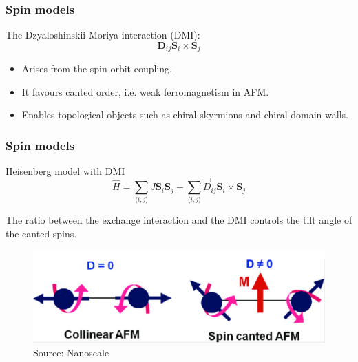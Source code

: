 \documentclass{beamer}
\newcommand{\bs}[1] {\boldsymbol{#1}}
\begin{document}
\begin{frame}
\frametitle{Spin models}
The Dzyaloshinskii-Moriya interaction (DMI):
\begin{equation*}
\bs{D}_{ij}\bs{S}_i\times\bs{S}_j
\end{equation*}
\begin{itemize}
\item Arises from the spin orbit coupling.
\item It favours canted order, i.e. weak ferromagnetism in AFM.
\item Enables topological objects such as chiral skyrmions and chiral domain walls.
\end{itemize}
\end{frame}


\begin{frame}
\frametitle{Spin models}
\begin{block}{Heisenberg model with DMI}
\begin{equation} 
\hat{H} = \sum_{\langle i,j \rangle} J \bs{S}_i \bs{S}_j + \sum_{\langle i,j \rangle} \vec{D}_{ij}\bs{S}_i \times \bs{S}_j\nonumber
\end{equation}

The ratio between the exchange interaction and the DMI controls the tilt angle of the canted spins.

\begin{figure}
  \begin{minipage}[c]{0.6\textwidth}
    \includegraphics[width=\textwidth]{../Figures/dmi_canting.png}
  \end{minipage}\hfill
  \begin{minipage}[c]{0.2\textwidth}
    \caption{Source: Nanoscale} \label{fig:3}
  \end{minipage}
\end{figure}

\end{block}
\end{frame}

\end{document}
